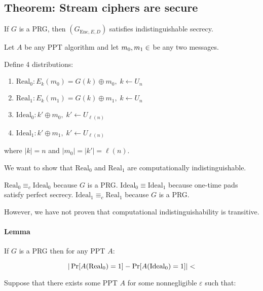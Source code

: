 \documentclass{idc_msc}
\DeclareMathOperator*{\xor}{\oplus}
\let\Messagespace\relax
\newcommand{\Messagespace}{\texorpdfstring{\ensuremath{\mathcal{P}}}{P}}
\let\negligible\relax
\DeclareMathOperator*{\negligible}{\mathrm{neg}}
\begin{document}
\subsection{Theorem: Stream ciphers are secure}

If \(G\) is a PRG, then \((G_{\mathrm{Enc}, E, D})\) satisfies indistinguishable secrecy.

Let \(A\) be any PPT algorithm and let \(m_0, m_1 \in \Messagespace\) be any two messages.

Define 4 distributions:

\begin{enumerate}
  \item \(\mathrm{Real}_0 : E_k(m_0) = G(k) \xor m_0,\; k \gets U_n\)
  \item \(\mathrm{Real}_1 : E_k(m_1) = G(k) \xor m_1,\; k \gets U_n\)
  \item \(\mathrm{Ideal}_0 : k' \xor m_0,\; k' \gets U_{\ell(n)}\)
  \item \(\mathrm{Ideal}_1 : k' \xor m_1,\; k' \gets U_{\ell(n)}\)
\end{enumerate}

where \(|k| = n\) and \(|m_0| = |k'| = \ell(n)\).

We want to show that \(\mathrm{Real}_0\) and \(\mathrm{Real}_1\) are computationally indistinguishable.


\(\mathrm{Real}_0 \equiv_c \mathrm{Ideal}_0\) because \(G\) is a PRG.
\(\mathrm{Ideal}_0 \equiv \mathrm{Ideal}_1\) because one-time pads satisfy perfect secrecy.
\(\mathrm{Ideal}_1 \equiv_c \mathrm{Real}_1\) because \(G\) is a PRG.

However, we have not proven that computational indistinguishability is transitive.

\paragraph{Lemma}

If \(G\) is a PRG then for any PPT \(A\):

\[
  |\Pr[A(\mathrm{Real}_0) = 1] - \Pr[A(\mathrm{Ideal}_0) = 1]| < \negligible
\]

Suppose that there exists some PPT \(A\) for some nonnegligible \(\varepsilon\) such that:
\end{document}
